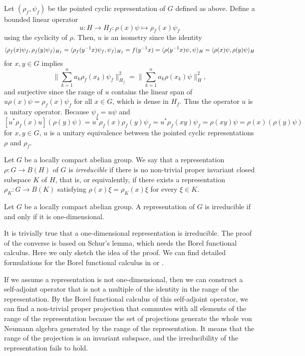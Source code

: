 \documentclass[a4paper]{article}
\begin{document}
\begin{pf}
Let $(\rho_f,\psi_f)$ be the pointed cyclic representation of $G$ defined as above.
Define a bounded linear operator
\[u:H\to H_f:\rho(x)\psi\mapsto\rho_f(x)\psi_f\]
using the cyclicity of $\rho$.
Then, $u$ is an isometry since the identity
\[\langle\rho_f(x)\psi_f,\rho_f(y)\psi_f\rangle_{H_f}=\langle\rho_f(y^{-1}x)\psi_f,\psi_f\rangle_{H_f}=f(y^{-1}x)=\langle\rho(y^{-1}x)\psi,\psi\rangle_H=\langle\rho(x)\psi,\rho(y)\psi\rangle_H\]
for $x,y\in G$ implies
\[\|\sum_{k=1}^na_k\rho_f(x_k)\psi_f\|_{H_f}^2=\|\sum_{k=1}^na_k\rho(x_k)\psi\|_H^2,\]
and surjective since the range of $u$ contains the linear span of $u\rho(x)\psi=\rho_f(x)\psi_f$ for all $x\in G$, which is dense in $H_f$.
Thus the operator $u$ is a unitary operator.
Because $\psi_f=u\psi$ and
\[[u^*\rho_f(x)u](\rho(y)\psi)=u^*\rho_f(x)\rho_f(y)\psi_f=u^*\rho_f(xy)\psi_f=\rho(xy)\psi=\rho(x)(\rho(y)\psi)\]
for $x,y\in G$, $u$ is a unitary equivalence between the pointed cyclic representations $\rho$ and $\rho_f$.
\end{pf}



\begin{defn}
Let $G$ be a locally compact abelian group.
We say that a representation $\rho:G\to B(H)$ of $G$ is \emph{irreducible} if there is no non-trivial proper invariant closed subspace $K$ of $H$, that is, or equivalently, if there exists a representation $\rho_K:G\to B(K)$ satisfying $\rho(x)\xi=\rho_K(x)\xi$ for every $\xi\in K$.
\end{defn}
\begin{lem}
Let $G$ be a locally compact abelian group.
A representation of $G$ is irreducible if and only if it is one-dimensional.
\end{lem}
\begin{pf}
It is trivially true that a one-dimensional representation is irreducible.
The proof of the converse is based on Schur's lemma, which needs the Borel functional calculus.
Here we only sketch the idea of the proof.
We can find detailed formulations for the Borel functional calculus in \cite{murphy2014c} or \cite{conway2019course}.

If we assume a representation is not one-dimensional, then we can construct a self-adjoint operator that is not a multiple of the identity in the range of the representation.
By the Borel functional calculus of this self-adjoint operator, we can find a non-trivial proper projection that commutes with all elements of the range of the representation because the set of projections generate the whole von Neumann algebra generated by the range of the representation.
It means that the range of the projection is an invariant subspace, and the irreducibility of the representation fails to hold.
\end{pf}
\end{document}
